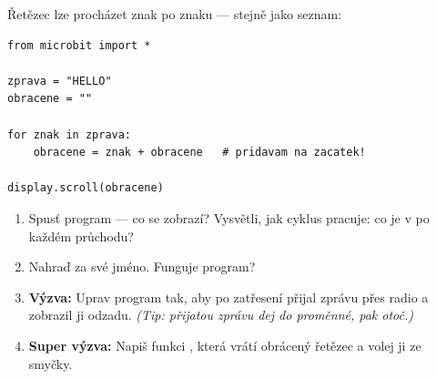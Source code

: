 \begin{bonusukol}

Řetězec lze procházet znak po znaku — stejně jako seznam:

\begin{lstlisting}
from microbit import *

zprava = "HELLO"
obracene = ""

for znak in zprava:
    obracene = znak + obracene   # pridavam na zacatek!

display.scroll(obracene)
\end{lstlisting}

\begin{enumerate}
  \item Spusť program — co se zobrazí?
        Vysvětli, jak cyklus pracuje: co je v 
        po každém průchodu?
  \item Nahraď  za své jméno. Funguje program?
  \item \textbf{Výzva:} Uprav program tak, aby po zatřesení přijal
        zprávu přes radio a zobrazil ji odzadu.
        \textit{(Tip: přijatou zprávu dej do proměnné, pak otoč.)}
  \item \textbf{Super výzva:} Napiš funkci ,
        která vrátí obrácený řetězec a volej ji ze smyčky.
\end{enumerate}

\odpoved[3cm]

\end{bonusukol}



